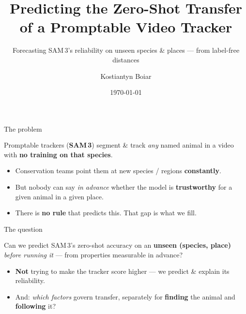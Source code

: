 \documentclass[aspectratio=169,11pt]{beamer}
\title[Predicting Zero-Shot Transfer]{Predicting the Zero-Shot Transfer\\of a Promptable Video Tracker}
\subtitle{Forecasting SAM\,3's reliability on unseen species \& places --- from label-free distances}
\author{Kostiantyn Boiar}
\institute{MSc Thesis Proposal \,\textbullet\, University of Glasgow\\[2pt]
\small Supervisor: Dr Marwa Mahmoud}
\date{\today}
\begin{document}
\begin{frame}[plain]
  \titlepage
\end{frame}

\begin{frame}{The problem}
  \begin{block}{}
    \centering\large
    Promptable trackers (\textbf{SAM\,3}) segment \& track \emph{any} named animal in a video with
    \textbf{no training on that species}.
  \end{block}
  \vspace{0.6em}
  \begin{itemize}
    \item Conservation teams point them at new species / regions \textbf{constantly}.
    \item But nobody can say \emph{in advance} whether the model is \textbf{trustworthy} for a given
          animal in a given place.
    \item There is \textbf{no rule} that predicts this. That gap is what we fill.
  \end{itemize}
\end{frame}

\begin{frame}{The question}
  \begin{block}{}
    \centering\large
    Can we predict SAM\,3's zero-shot accuracy on an \textbf{unseen (species, place)}
    \emph{before running it} --- from properties measurable in advance?
  \end{block}
  \vspace{0.6em}
  \begin{itemize}
    \item \textbf{Not} trying to make the tracker score higher --- we predict \& explain its reliability.
    \item And: \emph{which factors} govern transfer, separately for \textbf{finding} the animal and
          \textbf{following} it?
  \end{itemize}
\end{frame}
\end{document}
